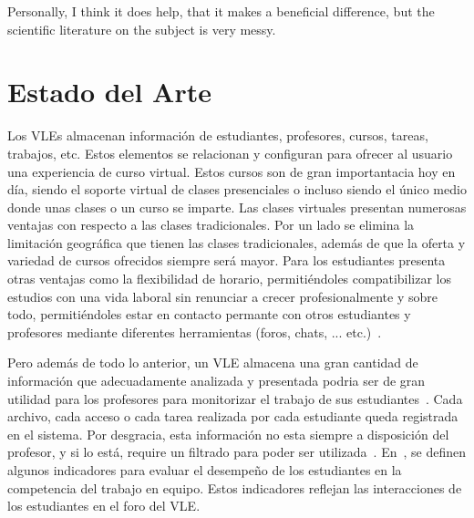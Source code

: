 

\begin{savequote}[50mm]
Personally, I think it does help, that it makes a beneficial difference, but the scientific literature on the subject is very messy.
%
\end{savequote}


\chapter{Estado del Arte}
\label{cha:State of the Art}

\ifpdf
    \graphicspath{{2_state_of_the_art/figures/PNG/}{2_state_of_the_art/figures/PDF/}{2_state_of_the_art/figures/}}
\else
    \graphicspath{{2_state_of_the_art/figures/EPS/}{2_state_of_the_art/figures/}}
\fi



Los VLEs almacenan información de estudiantes, profesores, cursos, tareas, trabajos, etc. Estos elementos se relacionan y configuran para ofrecer al usuario una experiencia de curso virtual. Estos cursos son de gran importantacia hoy en día, siendo el soporte virtual de clases presenciales o incluso siendo el único medio donde unas clases o un curso se imparte. Las clases virtuales presentan numerosas ventajas con respecto a las clases tradicionales. Por un lado se elimina la limitación geográfica que tienen las clases tradicionales, además de que la oferta y variedad de cursos ofrecidos siempre será mayor. Para los estudiantes presenta otras ventajas como la flexibilidad de horario, permitiéndoles compatibilizar los estudios con una vida laboral sin renunciar a crecer profesionalmente y sobre todo, permitiéndoles estar en contacto permante con otros estudiantes y profesores mediante diferentes herramientas (foros, chats, ... etc.)~\cite{alAjlan:2008}.


Pero además de todo lo anterior, un VLE almacena una gran cantidad de información que adecuadamente analizada y presentada podria ser de gran utilidad para los profesores para monitorizar el trabajo de sus estudiantes~\cite{podgorelec:2011}. Cada archivo, cada acceso o cada tarea realizada por cada estudiante queda registrada en el sistema. Por desgracia, esta información no esta siempre a disposición del profesor, y si lo está, require un filtrado para poder ser utilizada~\cite{Chebil:2012}. En~\cite{fidalgo:2015}, se definen algunos indicadores para evaluar el desempeño de los estudiantes en la competencia del trabajo en equipo. Estos indicadores reflejan las interacciones de los estudiantes en el foro del VLE.

